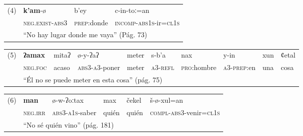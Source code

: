 {      %
      \begin{tabular}{rlll}
            \multicolumn{1}{l}{(4)} & \textbf{k'am}-ø                                            & b'ey                & c-in-toː=an                            \\
                                    & \textsc{neg.exist-abs3}                                    & \textsc{prep}:donde & \textsc{incomp-abs1s}-ir=\textsc{cl1s} \\
                                    & \multicolumn{3}{l}{“No hay lugar donde me vaya” (Pág. 73)}                                                                \\
      \end{tabular} \vspace{0.5cm}

      \begin{tabular}{rlllllllll}
            \multicolumn{1}{l}{(5)} & \textbf{ʔamax}                                                    & mitaʔ & ø-y-ʔaʔ                & meter & s-b'a            & nax                 & y-in                & xun & ȼetal \\
                                    & \textsc{neg.foc}                                                  & acaso & \textsc{abs3-a3}-poner & meter & \textsc{a3-refl} & \textsc{pro}:hombre & \textsc{a3-prep}:en & una & cosa  \\
                                    & \multicolumn{9}{l}{“Él no se puede meter en esta cosa” (pág. 75)}                                                                                                                       \\
      \end{tabular} \vspace{0.5cm}

      \begin{tabular}{rlllll}
            \multicolumn{1}{l}{(6)} & \textbf{man}                                      & ø-w-ʔoːtax              & max   & čekel & š-ø-xul=an                              \\
                                    & \textsc{neg.irr}                                  & \textsc{abs3-a1s}-saber & quién & quién & \textsc{compl-abs3}-venir=\textsc{cl1s} \\
                                    & \multicolumn{5}{l}{“No sé quién vino” (pág. 181)}                                                                                     \\
      \end{tabular} \vspace{0.5cm}

}
